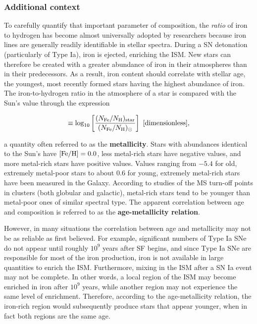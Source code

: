 \documentclass[a4paper,10pt]{article}
\begin{document}
\subsubsection{Additional context}

{\noindent}To carefully quantify that important parameter of composition, the \textit{ratio} of iron to hydrogen has become almost universally adopted by researchers because iron lines are generally readily identifiable in stellar spectra. During a SN detonation (particularly of Type Ia), iron is ejected, enriching the ISM. New stars can therefore be created with a greater abundance of iron in their atmospheres than in their predecessors. As a result, iron content should correlate with stellar age, the youngest, most recently formed stars having the highest abundance of iron. The iron-to-hydrogen ratio in the atmosphere of a star is compared with the Sun's value through the expression

\begin{align*}
    [{\rm Fe/H}] \equiv \log_{10} \left[\frac{(N_{\rm Fe}/N_{\rm H})_{\rm star}}{(N_{\rm Fe}/N_{\rm H})_\odot}\right] ~ [{\rm dimensionless}],
\end{align*}

{\noindent}a quantity often referred to as the \textbf{metallicity}. Stars with abundances identical to the Sun's have $[{\rm Fe/H}]=0.0$, less metal-rich stars have negative values, and more metal-rich stars have positive values. Values ranging from $-5.4$ for old, extremely metal-poor stars to about $0.6$ for young, extremely metal-rich stars have been measured in the Galaxy. According to studies of the MS turn-off points in clusters (both globular and galactic), metal-rich stars tend to be younger than metal-poor ones of similar spectral type. The apparent correlation between age and composition is referred to as the \textbf{age-metallicity relation}.

{\noindent}However, in many situations the correlation between age and metallicity may not be as reliable as first believed. For example, significant numbers of Type Ia SNe do not appear until roughly $10^9$ years after SF begins, and since Type Ia SNe are responsible for most of the iron production, iron is not available in large quantities to enrich the ISM. Furthermore, mixing in the ISM after a SN Ia event may not be complete. In other words, a local region of the ISM may become enriched in iron after $10^9$ years, while another region may not experience the same level of enrichment. Therefore, according to the age-metallicity relation, the iron-rich region would subsequently produce stars that appear younger, when in fact both regions are the same age.
\end{document}
